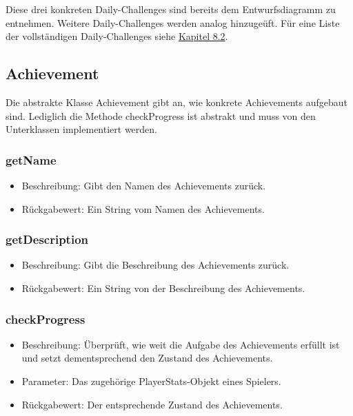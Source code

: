 \documentclass[a4paper]{scrreprt}
\begin{document}
	\vspace{8pt}

	Diese drei konkreten Daily-Challenges sind bereits dem Entwurfsdiagramm zu entnehmen. Weitere Daily-Challenges werden analog hinzugeüft. Für eine Liste der vollständigen Daily-Challenges siehe \hyperlink{Daily}{Kapitel 8.2}. \\

	\vspace{8pt}

	\subsection{Achievement}
	Die abstrakte Klasse Achievement gibt an, wie konkrete Achievements aufgebaut sind. Lediglich die Methode checkProgress ist abstrakt und muss von den Unterklassen implementiert werden.

	\subsubsection{getName}
	\begin{itemize}
		\item Beschreibung: Gibt den Namen des Achievements zurück.
		\item Rückgabewert: Ein String vom Namen des Achievements.
	\end{itemize}
	\subsubsection{getDescription}
	\begin{itemize}
		\item Beschreibung: Gibt die Beschreibung des Achievements zurück.
		\item Rückgabewert: Ein String von der Beschreibung des Achievements.
	\end{itemize}
	\subsubsection{checkProgress}
	\begin{itemize}
		\item Beschreibung: Überprüft, wie weit die Aufgabe des Achievements erfüllt ist und setzt dementsprechend den Zustand des Achievements.
		\item Parameter: Das zugehörige PlayerStats-Objekt eines Spielers.
		\item Rückgabewert: Der entsprechende Zustand des Achievements.
	\end{itemize}
\end{document}
